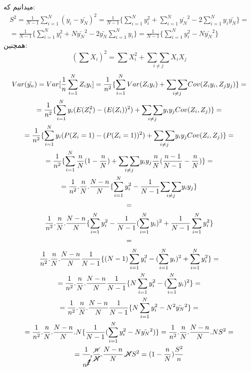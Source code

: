 میدانیم که:
\begin{gather*}
	S^2=\frac{1}{N-1}\sum_{i=1}^{N}(y_i-\bar{y_N})^2=\frac{1}{N-1}\{\sum_{i=1}^{N}y_i^2+\sum_{i=1}^{N}\bar{y_N}^2-2\sum_{i=1}^{N}y_i\bar{y_N}\}
	= \\=
	\frac{1}{N-1}\{\sum_{i=1}^{N}y_i^2+N\bar{y_N}^2-2\bar{y_N}\sum_{i=1}^{N}y_i\}
	=\frac{1}{N-1}\{\sum_{i=1}^{N}y_i^2-N\bar{y_N}^2\}
\end{gather*}
همچنین:
\begin{equation*}
	(\sum X_i)^2=\sum X_i^2+\underset{i\neq j}{\sum \sum}X_iX_j
\end{equation*}
\begin{multline*}
	Var(\bar{y_n})=Var[\frac{1}{n}\sum_{i=1}^{N}Z_iy_i]
	=\frac{1}{n^2}\{\sum_{i=1}^{N}Var(Z_iy_i)+\underset{i\neq j}{\sum \sum }Cov(Z_iy_i,Z_jy_j) \}
	= \\ =
	\frac{1}{n^2}\{\sum_{i=1}^{N}y_i(E(Z_i^2)-(E(Z_i))^2)+\underset{i\neq j}{\sum \sum }y_iy_jCov(Z_i,Z_j) \}
	=\\=
	\frac{1}{n^2}\{\sum_{i=1}^{N}y_i(P(Z_i=1)-(P(Z_i=1))^2)+\underset{i\neq j}{\sum \sum }y_iy_jCov(Z_i,Z_j) \}
	=\\=
	\frac{1}{n^2}\{\sum_{i=1}^{N}\frac{n}{N}(1-\frac{n}{N})+\underset{i\neq j}{\sum \sum }y_iy_j \frac{n}{N}(\frac{n-1}{N-1}-\frac{n}{N}) \} 
	=\\=
	\frac{1}{n^2}.\frac{n}{N}.\frac{N-n}{N}\{\sum_{i=1}^{N}y_i^2 -\frac{1}{N-1} \underset{i\neq j}{\sum \sum }y_iy_j\}
	\\=\\
	\frac{1}{n^2}.\frac{n}{N}.\frac{N-n}{N}\{\sum_{i=1}^{N}y_i^2 -\frac{1}{N-1}(\sum_{i=1}^{N}y_i)^2+
	\frac{1}{N-1}\sum_{i=1}^{N}y_i^2\} 
	\\=\\
	\frac{1}{n^2}.\frac{n}{N}.\frac{N-n}{N}\frac{1}{N-1}\{(N-1)\sum_{i=1}^{N}y_i^2 -(\sum_{i=1}^{N}y_i)^2+
	\sum_{i=1}^{N}y_i^2\} 
	= \\=
	\frac{1}{n^2}.\frac{n}{N}.\frac{N-n}{N}\frac{1}{N-1}\{N\sum_{i=1}^{N}y_i^2 -(\sum_{i=1}^{N}y_i)^2\} 
	= \\ =
	\frac{1}{n^2}.\frac{n}{N}.\frac{N-n}{N}\frac{1}{N-1}\{N\sum_{i=1}^{N}y_i^2 -N^2\bar{y_N}^2\} 
	= \\ =
	\frac{1}{n^2}.\frac{n}{N}.\frac{N-n}{N}.N\{\frac{1}{N-1}(\sum_{i=1}^{N}y_i^2 -N\bar{y_N}^2)\} 
	=
	\frac{1}{n^2}.\frac{n}{N}.\frac{N-n}{N}.NS^2
	=\\=
	\frac{1}{n^{\cancelto{1}{2}}}.\frac{\cancel{n}}{\cancel{N}}.\frac{N-n}{N}.\cancel{N}S^2
	=(1-\frac{n}{N})\frac{S^2}{n}
\end{multline*}
